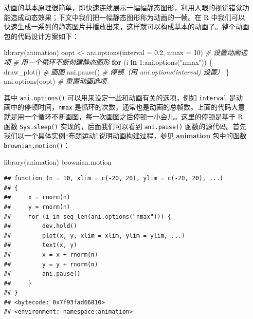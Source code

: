 \documentclass[
  b5paper,
  UTF8,twoside]{book}
\newenvironment{Shaded}{\begin{snugshade}}{\end{snugshade}}
\newcommand{\AttributeTok}[1]{\textcolor[rgb]{0.77,0.63,0.00}{#1}}
\newcommand{\CommentTok}[1]{\textcolor[rgb]{0.56,0.35,0.01}{\textit{#1}}}
\newcommand{\ControlFlowTok}[1]{\textcolor[rgb]{0.13,0.29,0.53}{\textbf{#1}}}
\newcommand{\DecValTok}[1]{\textcolor[rgb]{0.00,0.00,0.81}{#1}}
\newcommand{\FloatTok}[1]{\textcolor[rgb]{0.00,0.00,0.81}{#1}}
\newcommand{\FunctionTok}[1]{\textcolor[rgb]{0.00,0.00,0.00}{#1}}
\newcommand{\NormalTok}[1]{#1}
\newcommand{\OtherTok}[1]{\textcolor[rgb]{0.56,0.35,0.01}{#1}}
\newcommand{\SpecialCharTok}[1]{\textcolor[rgb]{0.00,0.00,0.00}{#1}}
\newcommand{\StringTok}[1]{\textcolor[rgb]{0.31,0.60,0.02}{#1}}
\begin{document}
动画的基本原理很简单，即快速连续展示一幅幅静态图形，利用人眼的视觉错觉功能造成动态效果；下文中我们把一幅静态图形称为动画的一帧。在 R 中我们可以快速生成一系列的静态图片并播放出来，这样就可以构成基本的动画了。整个动画包的代码设计方案如下：

\begin{Shaded}
\begin{Highlighting}[]
\FunctionTok{library}\NormalTok{(animation)}
\NormalTok{oopt }\OtherTok{\textless{}{-}} \FunctionTok{ani.options}\NormalTok{(}\AttributeTok{interval =} \FloatTok{0.2}\NormalTok{, }\AttributeTok{nmax =} \DecValTok{10}\NormalTok{) }\CommentTok{\# 设置动画选项}
\CommentTok{\# 用一个循环不断创建静态图形}
\ControlFlowTok{for}\NormalTok{ (i }\ControlFlowTok{in} \DecValTok{1}\SpecialCharTok{:}\FunctionTok{ani.options}\NormalTok{(}\StringTok{"nmax"}\NormalTok{)) \{}
  \FunctionTok{draw\_plot}\NormalTok{() }\CommentTok{\# 画图}
  \FunctionTok{ani.pause}\NormalTok{() }\CommentTok{\# 停顿（用 ani.options(\textquotesingle{}interval\textquotesingle{}) 设置）}
\NormalTok{\}}
\FunctionTok{ani.options}\NormalTok{(oopt) }\CommentTok{\# 重置动画选项}
\end{Highlighting}
\end{Shaded}

其中 \texttt{ani.options()} 可以用来设定一些和动画有关的选项，例如 \texttt{interval} 是动画中的停顿时间，\texttt{nmax} 是循环的次数，通常也是动画的总帧数。上面的代码大意就是用一个循环不断画图，每一次画图之后停顿一小会儿。这里的停顿是基于 R 函数 \texttt{Sys.sleep()} 实现的，后面我们可以看到 \texttt{ani.pause()} 函数的源代码。首先我们以一个具体实例``布朗运动''说明动画构建过程，参见 \textbf{animation} 包中的函数 \texttt{brownian.motion()}：

\begin{Shaded}
\begin{Highlighting}[]
\FunctionTok{library}\NormalTok{(animation)}
\NormalTok{brownian.motion}
\end{Highlighting}
\end{Shaded}

\begin{verbatim}
## function (n = 10, xlim = c(-20, 20), ylim = c(-20, 20), ...) 
## {
##     x = rnorm(n)
##     y = rnorm(n)
##     for (i in seq_len(ani.options("nmax"))) {
##         dev.hold()
##         plot(x, y, xlim = xlim, ylim = ylim, ...)
##         text(x, y)
##         x = x + rnorm(n)
##         y = y + rnorm(n)
##         ani.pause()
##     }
## }
## <bytecode: 0x7f93fad66810>
## <environment: namespace:animation>
\end{verbatim}
\end{document}
